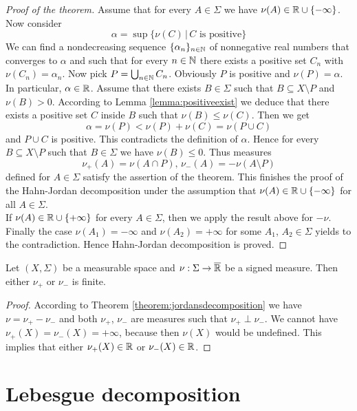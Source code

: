 \begin{proof}[Proof of the theorem]
Assume that for every $A\in \Sigma$ we have $\nu(A) \in {\mathbb R}\cup \{-\infty\}$. Now consider 
$$\alpha=\sup \big\{\nu(C)\,\big|\,C\mbox{ is positive}\big\}$$
We can find a nondecreasing sequence $\{\alpha_n\}_{n\in {\mathbb N}}$ of nonnegative real numbers that converges to $\alpha$ and such that for every $n\in {\mathbb N}$ there exists a positive set $C_n$ with $\nu(C_n)=\alpha_n$. Now pick $P=\bigcup_{n\in {\mathbb N}}C_n$. Obviously $P$ is positive and $\nu(P)=\alpha$. In particular, $\alpha \in {\mathbb R}$. Assume that there exists $B\in \Sigma$ such that $B\subseteq X\setminus P$ and $\nu(B)>0$. According to Lemma \ref{lemma:positiveexist} we deduce that there exists a positive set $C$ inside $B$ such that $\nu(B)\leq \nu(C)$. Then we get
$$\alpha=\nu(P)<\nu(P)+\nu(C)=\nu(P\cup C)$$
and $P\cup C$ is positive. This contradicts the definition of $\alpha$. Hence for every $B\subseteq X\setminus P$ such that $B\in \Sigma$ we have $\nu(B)\leq 0$. Thus measures
$$\nu_+(A) = \nu(A\cap P),\,\nu_-(A) = -\nu(A\setminus P)$$
defined for $A\in \Sigma$ satisfy the assertion of the theorem. This finishes the proof of the Hahn-Jordan decomposition under the assumption that $\nu(A)\in {\mathbb R}\cup \{-\infty\}$ for all $A\in \Sigma$.\\
If $\nu(A)\in {\mathbb R}\cup \{+\infty\}$ for every $A\in \Sigma$, then we apply the result above for $-\nu$. Finally the case $\nu(A_1)=-\infty$ and $\nu(A_2)=+\infty$ for some $A_1$, $A_2\in \Sigma$ yields to the contradiction. Hence Hahn-Jordan decomposition is proved.
\end{proof}

\begin{corollary}\label{corollary:oneisfinite}
Let $\left(X,\Sigma\right)$ be a measurable space and $\nu:\Sigma\rightarrow \overline{{\mathbb R}}$ be a signed measure. Then either $\nu_+$ or $\nu_-$ is finite.
\end{corollary}
\begin{proof}
According to Theorem \ref{theorem:jordansdecomposition} we have $\nu = \nu_+-\nu_-$ and both $\nu_+$, $\nu_-$ are measures such that $\nu_+\perp \nu_-$. We cannot have $\nu_+(X)=\nu_-(X)=+\infty$, because then $\nu(X)$ would be undefined. This implies that either $\nu_+(X)\in {\mathbb R}$ or $\nu_-(X)\in {\mathbb R}$.
\end{proof}

\section{Lebesgue decomposition}

